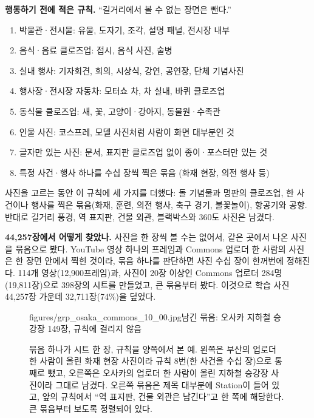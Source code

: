 \documentclass[11pt]{article}
\begin{document}
\textbf{행동하기 전에 적은 규칙.} ``길거리에서 볼 수 없는 장면은 뺀다.''
\begin{enumerate}
\item 박물관·전시물: 유물, 도자기, 조각, 설명 패널, 전시장 내부
\item 음식·음료 클로즈업: 접시, 음식 사진, 술병
\item 실내 행사: 기자회견, 회의, 시상식, 강연, 공연장, 단체 기념사진
\item 행사장·전시장 자동차: 모터쇼 차, 차 실내, 바퀴 클로즈업
\item 동식물 클로즈업: 새, 꽃, 고양이·강아지, 동물원·수족관
\item 인물 사진: 코스프레, 모델 사진처럼 사람이 화면 대부분인 것
\item 글자만 있는 사진: 문서, 표지판 클로즈업 없이 종이·포스터만 있는 것
\item 특정 사건·행사 하나를 수십 장씩 찍은 묶음 (화재 현장, 의전 행사 등)
\end{enumerate}
사진을 고르는 동안 이 규칙에 세 가지를 더했다: 돌 기념물과 명판의 클로즈업, 한
사건이나 행사를 찍은 묶음(화재, 훈련, 의전 행사, 축구 경기, 불꽃놀이), 항공기와
공항. 반대로 길거리 풍경, 역 표지판, 건물 외관, 블랙박스와 360도 사진은 남겼다.

\textbf{44,257장에서 어떻게 찾았나.} 사진을 한 장씩 볼 수는 없어서, 같은 곳에서
나온 사진을 묶음으로 봤다. YouTube 영상 하나의 프레임과 Commons 업로더 한 사람의
사진은 한 장면 안에서 찍힌 것이라, 묶음 하나를 판단하면 사진 수십 장이 한꺼번에
정해진다. 114개 영상(12,900프레임)과, 사진이 20장 이상인 Commons 업로더 284명
(19,811장)으로 398장의 시트를 만들었고, 큰 묶음부터 봤다. 이것으로 학습 사진
44,257장 가운데 32,711장(74\%)을 덮었다.

\begin{figure}[h]
\centering
{}%
{figures/grp_osaka_commons_10_00.jpg}{남긴 묶음: 오사카 지하철 승강장 149장, 규칙에 걸리지 않음}
\caption{묶음 하나가 시트 한 장, 규칙을 양쪽에서 본 예. 왼쪽은 부산의 업로더 한 사람이
올린 화재 현장 사진이라 규칙 8번(한 사건을 수십 장)으로 통째로 뺐고, 오른쪽은 오사카의
업로더 한 사람이 올린 지하철 승강장 사진이라 그대로 남겼다. 오른쪽 묶음은 제목 대부분에
Station이 들어 있고, 앞의 규칙에서 ``역 표지판, 건물 외관은 남긴다''고 한 쪽에 해당한다.
큰 묶음부터 보도록 정렬되어 있다.}
\end{figure}

\end{document}

